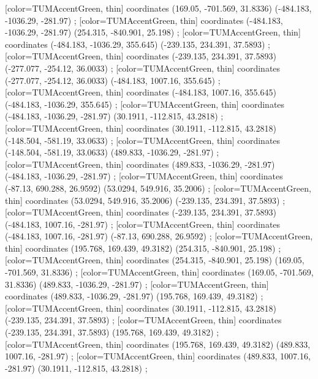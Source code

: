         [color=TUMAccentGreen, thin] coordinates { (169.05, -701.569, 31.8336) (-484.183, -1036.29, -281.97) };
        [color=TUMAccentGreen, thin] coordinates { (-484.183, -1036.29, -281.97) (254.315, -840.901, 25.198) };
        [color=TUMAccentGreen, thin] coordinates { (-484.183, -1036.29, 355.645) (-239.135, 234.391, 37.5893) };
        [color=TUMAccentGreen, thin] coordinates { (-239.135, 234.391, 37.5893) (-277.077, -254.12, 36.0033) };
        [color=TUMAccentGreen, thin] coordinates { (-277.077, -254.12, 36.0033) (-484.183, 1007.16, 355.645) };
        [color=TUMAccentGreen, thin] coordinates { (-484.183, 1007.16, 355.645) (-484.183, -1036.29, 355.645) };
        [color=TUMAccentGreen, thin] coordinates { (-484.183, -1036.29, -281.97) (30.1911, -112.815, 43.2818) };
        [color=TUMAccentGreen, thin] coordinates { (30.1911, -112.815, 43.2818) (-148.504, -581.19, 33.0633) };
        [color=TUMAccentGreen, thin] coordinates { (-148.504, -581.19, 33.0633) (489.833, -1036.29, -281.97) };
        [color=TUMAccentGreen, thin] coordinates { (489.833, -1036.29, -281.97) (-484.183, -1036.29, -281.97) };
        [color=TUMAccentGreen, thin] coordinates { (-87.13, 690.288, 26.9592) (53.0294, 549.916, 35.2006) };
        [color=TUMAccentGreen, thin] coordinates { (53.0294, 549.916, 35.2006) (-239.135, 234.391, 37.5893) };
        [color=TUMAccentGreen, thin] coordinates { (-239.135, 234.391, 37.5893) (-484.183, 1007.16, -281.97) };
        [color=TUMAccentGreen, thin] coordinates { (-484.183, 1007.16, -281.97) (-87.13, 690.288, 26.9592) };
        [color=TUMAccentGreen, thin] coordinates { (195.768, 169.439, 49.3182) (254.315, -840.901, 25.198) };
        [color=TUMAccentGreen, thin] coordinates { (254.315, -840.901, 25.198) (169.05, -701.569, 31.8336) };
        [color=TUMAccentGreen, thin] coordinates { (169.05, -701.569, 31.8336) (489.833, -1036.29, -281.97) };
        [color=TUMAccentGreen, thin] coordinates { (489.833, -1036.29, -281.97) (195.768, 169.439, 49.3182) };
        [color=TUMAccentGreen, thin] coordinates { (30.1911, -112.815, 43.2818) (-239.135, 234.391, 37.5893) };
        [color=TUMAccentGreen, thin] coordinates { (-239.135, 234.391, 37.5893) (195.768, 169.439, 49.3182) };
        [color=TUMAccentGreen, thin] coordinates { (195.768, 169.439, 49.3182) (489.833, 1007.16, -281.97) };
        [color=TUMAccentGreen, thin] coordinates { (489.833, 1007.16, -281.97) (30.1911, -112.815, 43.2818) };
